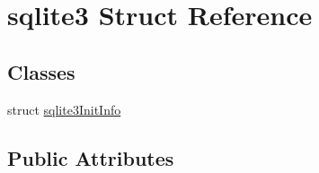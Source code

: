 \hypertarget{structsqlite3}{\section{sqlite3 Struct Reference}
\label{structsqlite3}
}
\subsection*{Classes}
\begin{DoxyCompactItemize}
\item 
struct \hyperlink{structsqlite3_1_1sqlite3_init_info}{sqlite3\-Init\-Info}
\end{DoxyCompactItemize}
\subsection*{Public Attributes}
